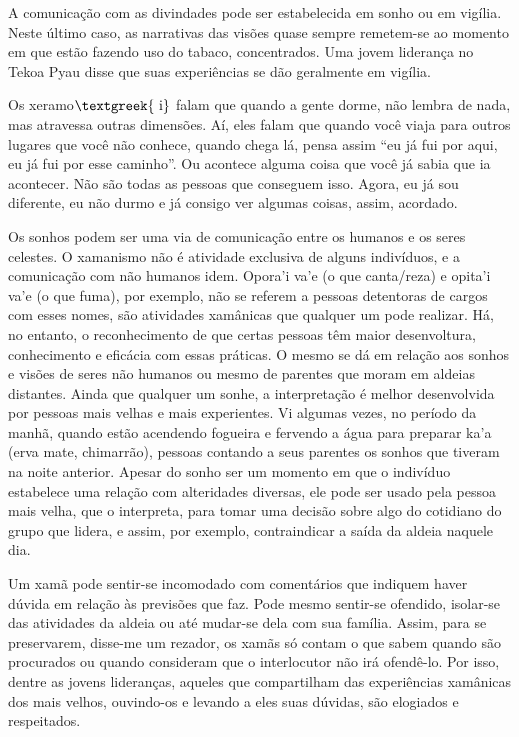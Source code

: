 \documentclass{article}
\begin{document}
A comunica\c{c}\~ao com as divindades pode ser estabelecida em sonho ou
em vig\'ilia. Neste \'ultimo caso, as narrativas das vis\~oes quase
sempre remetem-se ao momento em que est\~ao fazendo uso do tabaco,
concentrados. Uma jovem lideran\c{c}a no Tekoa Pyau disse que suas
experi\^encias se d\~ao geralmente em vig\'ilia.

Os xeramo$\text{\textgreek{~i}}$ falam que quando a gente dorme, n\~ao
lembra de nada, mas atravessa outras dimens\~oes. A\'i, eles falam que
quando voc\^e viaja para outros lugares que voc\^e n\~ao conhece,
quando chega l\'a, pensa assim {\textquotedblleft}eu j\'a fui por aqui,
eu j\'a fui por esse caminho{\textquotedblright}. Ou acontece alguma
coisa que voc\^e j\'a sabia que ia acontecer. N\~ao s\~ao todas as
pessoas que conseguem isso. Agora, eu j\'a sou diferente, eu n\~ao
durmo e j\'a consigo ver algumas coisas, assim, acordado.

Os sonhos podem ser uma via de comunica\c{c}\~ao entre os humanos e os
seres celestes. O xamanismo n\~ao \'e atividade exclusiva de alguns
indiv\'iduos, e a comunica\c{c}\~ao com n\~ao humanos idem.
Opora{\textquoteright}i va{\textquoteright}e (o que canta/reza) e
opita{\textquoteright}i va{\textquoteright}e (o que fuma), por exemplo,
n\~ao se referem a pessoas detentoras de cargos com esses nomes, s\~ao
atividades xam\^anicas que qualquer um pode realizar. H\'a, no entanto,
o reconhecimento de que certas pessoas t\^em maior desenvoltura,
conhecimento e efic\'acia com essas pr\'aticas. O mesmo se d\'a em
rela\c{c}\~ao aos sonhos e vis\~oes de seres n\~ao humanos ou mesmo de
parentes que moram em aldeias distantes. Ainda que qualquer um sonhe, a
interpreta\c{c}\~ao \'e melhor desenvolvida por pessoas mais velhas e
mais experientes. Vi algumas vezes, no per\'iodo da manh\~a, quando
est\~ao acendendo fogueira e fervendo a \'agua para preparar
ka{\textquoteright}a (erva mate, chimarr\~ao), pessoas contando a seus
parentes os sonhos que tiveram na noite anterior. Apesar do sonho ser
um momento em que o indiv\'iduo estabelece uma rela\c{c}\~ao com
alteridades diversas, ele pode ser usado pela pessoa mais velha, que o
interpreta, para tomar uma decis\~ao sobre algo do cotidiano do grupo
que lidera, e assim, por exemplo, contraindicar a sa\'ida da aldeia
naquele dia.

Um xam\~a pode sentir-se incomodado com coment\'arios que indiquem haver
d\'uvida em rela\c{c}\~ao \`as previs\~oes que faz. Pode mesmo
sentir-se ofendido, isolar-se das atividades da aldeia ou at\'e
mudar-se dela com sua fam\'ilia. Assim, para se preservarem, disse-me
um rezador, os xam\~as s\'o contam o que sabem quando s\~ao procurados
ou quando consideram que o interlocutor n\~ao ir\'a ofend\^e-lo. Por
isso, dentre as jovens lideran\c{c}as, aqueles que compartilham das
experi\^encias xam\^anicas dos mais velhos, ouvindo-os e levando a eles
suas d\'uvidas, s\~ao elogiados e respeitados.
\end{document}
